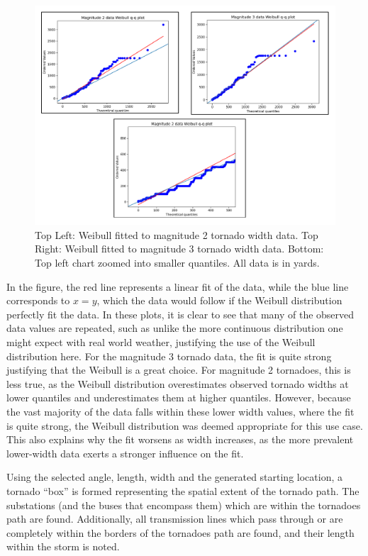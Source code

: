 \documentclass[12pt]{article}
\begin{document}
\begin{figure}[ht]
    \centering %
    \includegraphics[width=\textwidth]{WeibullDistribs.pdf}
    \caption[Fitted tornado width Q-Q plots]{Top Left: Weibull fitted to magnitude 2 tornado width data. Top Right: Weibull fitted to magnitude 3 tornado width data. Bottom: Top left chart zoomed into smaller quantiles. All data is in yards.}
    \label{fig:WeibullDistribs}
\end{figure}
In the figure, the red line represents a linear fit of the data, while the blue line corresponds to $x=y$, which the data would follow if the Weibull distribution perfectly fit the data. In these plots, it is clear to see that many of the observed data values are repeated, such as  unlike the more continuous distribution one might expect with real world weather, justifying the use of the Weibull distribution here.  For the magnitude 3 tornado data, the fit is quite strong justifying that the Weibull is a great choice. For magnitude 2 tornadoes, this is less true, as the Weibull distribution overestimates observed tornado widths at lower quantiles and underestimates them at higher quantiles. However, because the vast majority of the data falls within these lower width values, where the fit is quite strong, the Weibull distribution was deemed appropriate for this use case. This also explains why the fit worsens as width increases, as the more prevalent lower-width data exerts a stronger influence on the fit. \par


Using the selected angle, length, width and the generated starting location, a tornado “box” is formed representing the spatial extent of the tornado path. The substations (and the buses that encompass them) which are within the tornadoes path are found. Additionally, all transmission lines which pass through or are completely within the borders of the tornadoes path are found, and their length within the storm is noted. \par
\end{document}
